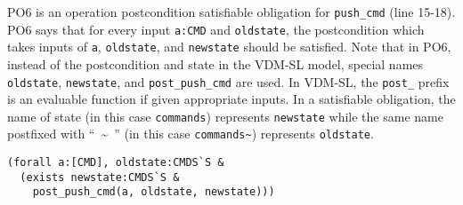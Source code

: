 PO6 is an operation postcondition satisfiable obligation for {\tt push\_cmd} (line 15-18). PO6 says that for every input {\tt a:CMD} and {\tt oldstate}, the postcondition which takes inputs of {\tt a}, {\tt oldstate}, and {\tt newstate} should be satisfied. Note that in PO6, instead of the postcondition and state in the VDM-SL model, special names {\tt oldstate}, {\tt newstate}, and {\tt post\_push\_cmd} are used. In VDM-SL, the {\tt post\_} prefix is an evaluable function if given appropriate inputs. In a satisfiable obligation, the name of state (in this case {\tt commands}) represents {\tt newstate} while the same name postfixed with ``~\textasciitilde~'' (in this case {\tt commands\textasciitilde}) represents {\tt oldstate}.

\begin{mdframed}[roundcorner=5pt]
\begin{Verbatim}[fontsize=\small]
(forall a:[CMD], oldstate:CMDS`S &
  (exists newstate:CMDS`S &
    post_push_cmd(a, oldstate, newstate)))
\end{Verbatim}
\end{mdframed}
